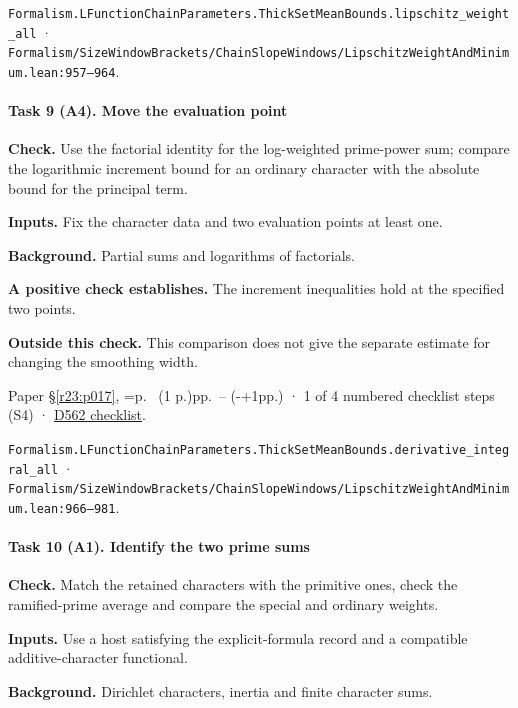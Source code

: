 \nolinkurl{Formalism.LFunctionChainParameters.ThickSetMeanBounds.lipschitz_weight_all} · \nolinkurl{Formalism/SizeWindowBrackets/ChainSlopeWindows/LipschitzWeightAndMinimum.lean:957–964}.

\paragraph{Task 9 (A4). Move the evaluation point}\label{v7:task-9}

\textbf{Check.} Use the factorial identity for the log-weighted prime-power sum; compare the logarithmic increment bound for an ordinary character with the absolute bound for the principal term.

\textbf{Inputs.} Fix the character data and two evaluation points at least one.

\textbf{Background.} Partial sums and logarithms of factorials.

\textbf{A positive check establishes.} The increment inequalities hold at the specified two points.

\textbf{Outside this check.} This comparison does not give the separate estimate for changing the smoothing width.

Paper \S\ref{r23:p017}, \ifnum{}=\relax p.\ \pageref{r24:regular} (1 p.)\else pp.\ \pageref{r24:regular}--\pageref{v5:regular-end} (\number\numexpr{}-+1\relax pp.)\fi{} · 1 of 4 numbered checklist steps (S4) · \href{https://github.com/GunheeC/rh-lean-verification-atlas/blob/v0.1.0/units/D562.check.md}{D562 checklist}.

\nolinkurl{Formalism.LFunctionChainParameters.ThickSetMeanBounds.derivative_integral_all} · \nolinkurl{Formalism/SizeWindowBrackets/ChainSlopeWindows/LipschitzWeightAndMinimum.lean:966–981}.

\paragraph{Task 10 (A1). Identify the two prime sums}\label{v7:task-10}

\textbf{Check.} Match the retained characters with the primitive ones, check the ramified-prime average and compare the special and ordinary weights.

\textbf{Inputs.} Use a host satisfying the explicit-formula record and a compatible additive-character functional.

\textbf{Background.} Dirichlet characters, inertia and finite character sums.

